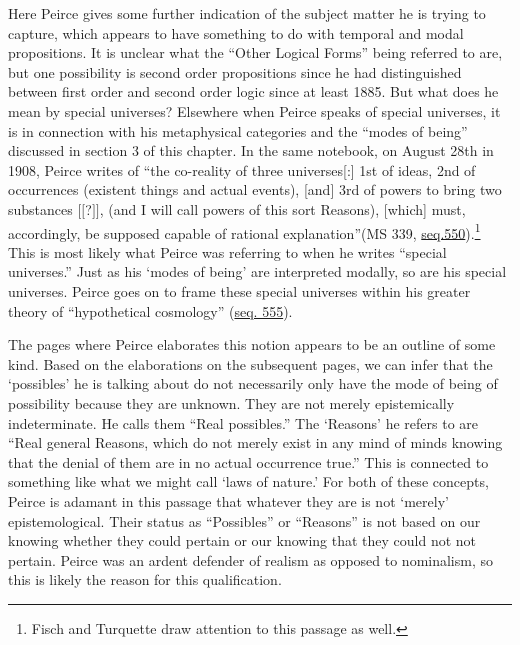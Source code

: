 Here Peirce gives some further indication of the subject matter he is trying to capture, which appears to have something to do with temporal and modal propositions. It is unclear what the ``Other Logical Forms'' being referred to are, but one possibility is second order propositions since he had distinguished between first order and second order logic since at least 1885. But what does he mean by special universes? Elsewhere when Peirce speaks of special universes, it is in connection with his metaphysical categories and the ``modes of being'' discussed in section 3 of this chapter. In the same notebook, on August 28th in 1908, Peirce writes of ``the co-reality of three universes[:] 1st of ideas, 2nd of occurrences (existent things and actual events), [and] 3rd of powers to bring two substances $[\!\![$?$]\!\!]$, (and I will call powers of this sort Reasons), [which] must, accordingly, be supposed capable of rational explanation''(MS 339, \href{https://iiif.lib.harvard.edu/manifests/view/drs:15255301$550i}{seq.550}).\footnote{Fisch and Turquette draw attention to this passage as well.} This is most likely what Peirce was referring to when he writes ``special universes.'' Just as his `modes of being' are interpreted modally, so are his special universes. Peirce goes on to frame these special universes within his greater theory of ``hypothetical cosmology'' (\href{https://iiif.lib.harvard.edu/manifests/view/drs:15255301$555i}{seq. 555}).

The pages where Peirce elaborates this notion appears to be an outline of some kind. Based on the elaborations on the subsequent pages, we can infer that the `possibles' he is talking about do not necessarily only have the mode of being of possibility because they are unknown. They are not merely epistemically indeterminate. He calls them ``Real possibles.'' The `Reasons' he refers to are ``Real general Reasons, which do not merely exist in any mind of minds knowing that the denial of them are in no actual occurrence true.'' This is connected to something like what we might call `laws of nature.' For both of these concepts, Peirce is adamant in this passage that whatever they are is not `merely' epistemological. Their status as ``Possibles'' or ``Reasons'' is not based on our knowing whether they could pertain or our knowing that they could not not pertain. Peirce was an ardent defender of realism as opposed to nominalism, so this is likely the reason for this qualification.

